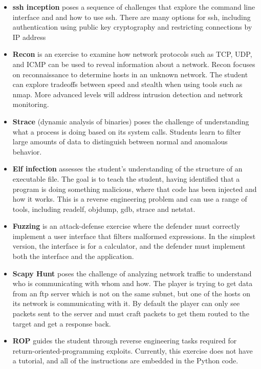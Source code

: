 \documentclass[11pt]{report}
\newcommand{\eat}[1]{}
\begin{document}
\begin{itemize}
\item {\bf ssh inception} poses a sequence of challenges that explore the command line interface and
  and how to use ssh.  There are many options for ssh, including authentication using public key
  cryptography and restricting connections by IP address
\item {\bf Recon} is an exercise to examine how network protocols such as TCP, UDP, and ICMP 
can be used to reveal information about a network.  Recon 
focuses on reconnaissance to determine hosts in an unknown network. 
The student can explore tradeoffs between speed and stealth
when using tools such as nmap.
More advanced levels will address intrusion detection and network monitoring.

\item {\bf Strace} (dynamic analysis of binaries) poses the challenge of 
 understanding what
a process is doing based on its system calls.  Students learn to filter large 
amounts of data to distinguish between normal and anomalous behavior.

\item {\bf Elf infection} assesses the student's understanding 
of the structure of an executable file.  The goal is to teach the student, having identified that a program is 
doing something malicious, where that code has been injected and how it works.  This 
is a reverse engineering problem and can use a range of tools, including readelf, objdump, gdb, 
strace and netstat.

\item {\bf Fuzzing} is an attack-defense exercise where the defender must correctly implement a user 
interface that filters malformed expressions.  In the simplest version, the interface is for a 
calculator, and the defender must implement both the interface and the application.  

\item {\bf Scapy Hunt} poses the challenge of analyzing network traffic 
to understand who is communicating with whom and how. The player is trying to get data from an ftp server
which is not on the same subnet, but one of the hosts on its network is communicating with it.
By default the player can only see packets sent to the server and must craft packets to get them routed
to the target and get a response back.

\item {\bf ROP} guides the student through reverse engineering tasks required for return-oriented-programming exploits.  Currently, this exercise does not have a tutorial, and all of the instructions are embedded in the Python code.

\eat{
\item {\bf Firewall} is still being implemented.  It requires students to understand the 
interactions between multiple firewalls which have different rule sets.
} %
\end{itemize}
\end{document}
